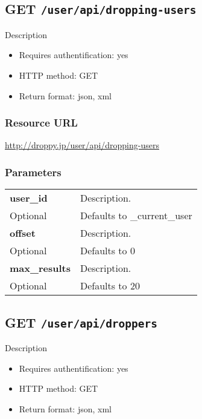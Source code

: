 \documentclass[11pt,a4paper]{article}
\newcommand{\content}[1]{\begin{minipage}{10cm}\vspace{2mm}#1\vspace{2mm}\end{minipage}}
\begin{document}
      \newpage
      
      
  \subsection*{GET {\tt /user/api/dropping-users}}
  Description
  \begin{itemize}
  \item Requires authentification: yes
  \item HTTP method: GET
  \item Return format: json, xml
  \end{itemize}
  \subsubsection*{Resource URL}
  \url{http://droppy.jp/user/api/dropping-users}
  \subsubsection*{Parameters}
  \begin{table}[h]
    \begin{center}
      \begin{tabular}{l l}
        \hline 
      \textbf{user\_id} & \content{Description. }
      \\
      Optional & Defaults to \_current\_user\\
      \hline
      \textbf{offset} & \content{Description. }
      \\
      Optional & Defaults to 0\\
      \hline
      \textbf{max\_results} & \content{Description. }
      \\
      Optional & Defaults to 20\\
      \hline
      \end{tabular}
    \end{center}
  \end{table}
  
      \newpage
      
      
  \subsection*{GET {\tt /user/api/droppers}}
  Description
  \begin{itemize}
  \item Requires authentification: yes
  \item HTTP method: GET
  \item Return format: json, xml
  \end{itemize}
\end{document}

